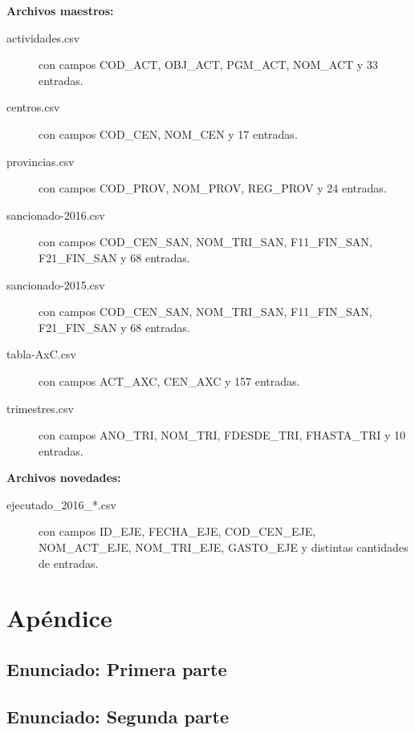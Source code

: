 \documentclass[10pt,a4paper]{article}
\begin{document}
\textbf{Archivos maestros:}
\begin{description}
    \item [actividades.csv] con campos COD\_ACT, OBJ\_ACT, PGM\_ACT, NOM\_ACT y 33 entradas.
    \item [centros.csv] con campos COD\_CEN, NOM\_CEN y 17 entradas.

    \item [provincias.csv] con campos COD\_PROV, NOM\_PROV, REG\_PROV y 24 entradas.
    \item [sancionado-2016.csv] con campos COD\_CEN\_SAN, NOM\_TRI\_SAN, F11\_FIN\_SAN, F21\_FIN\_SAN y 68 entradas.
    \item [sancionado-2015.csv] con campos COD\_CEN\_SAN, NOM\_TRI\_SAN, F11\_FIN\_SAN, F21\_FIN\_SAN y 68 entradas.
    \item [tabla-AxC.csv] con campos ACT\_AXC, CEN\_AXC y 157 entradas.
    \item [trimestres.csv] con campos ANO\_TRI, NOM\_TRI, FDESDE\_TRI, FHASTA\_TRI y 10 entradas.
\end{description}

\textbf{Archivos novedades:}
\begin{description}
    \item [ejecutado\_2016\_*.csv] con campos ID\_EJE, FECHA\_EJE, COD\_CEN\_EJE, NOM\_ACT\_EJE, NOM\_TRI\_EJE, GASTO\_EJE y distintas cantidades de entradas.
\end{description}

\section{Apéndice}
\subsection{Enunciado: Primera parte}


\subsection{Enunciado: Segunda parte}

\end{document}
